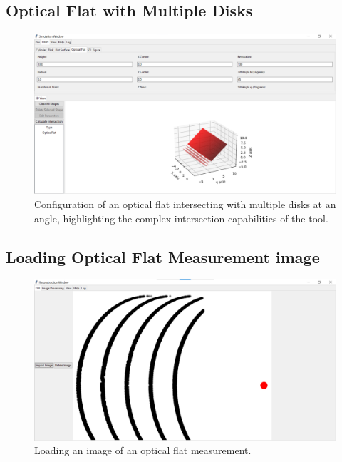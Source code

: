 \documentclass[../main.tex]{subfiles}
\begin{document}
\subsection{Optical Flat with Multiple Disks}
\begin{figure}[H]
\centering
\includegraphics[width=\textwidth]{Images/Appendix/simulation/optical_flat}
\caption{Configuration of an optical flat intersecting with multiple disks at an angle, highlighting the complex intersection capabilities of the tool.}
\end{figure}

\subsection{Loading Optical Flat Measurement image}
\begin{figure}[H]
\centering
\includegraphics[width=\textwidth]{Images/Appendix/reconstruction/image_load}
\caption{Loading an image of an optical flat measurement.}
\end{figure}
\end{document}
